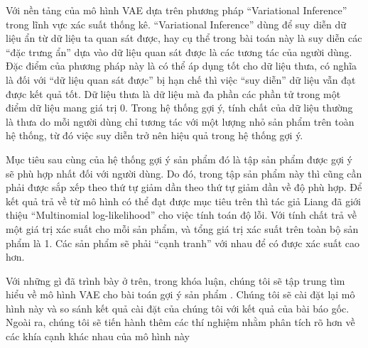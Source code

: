 Với nền tảng của mô hình VAE dựa trên phương pháp ``Variational Inference'' trong lĩnh vực xác suất thống kê. 
``Variational Inference'' dùng để suy diễn dữ liệu ẩn từ dữ liệu ta quan sát được, hay cụ thể trong bài toán này là suy diễn các ``đặc trưng ẩn'' dựa vào dữ liệu quan sát được là các tương tác của người dùng. 
Đặc điểm của phương pháp này là có thể áp dụng tốt cho dữ liệu thưa, có nghĩa là đối với ``dữ liệu quan sát được'' bị hạn chế thì việc ``suy diễn'' dữ liệu vẫn đạt được kết quả tốt. 
Dữ liệu thưa là dữ liệu mà đa phần các phần tử trong một điểm dữ liệu mang giá trị 0.
Trong hệ thống gợi ý, tính chất của dữ liệu thường là thưa do mỗi người dùng chỉ tương tác với một lượng nhỏ sản phẩm trên toàn hệ thống, từ đó việc suy diễn trở nên hiệu quả trong hệ thống gợi ý.

Mục tiêu sau cùng của hệ thống gợi ý sản phẩm đó là tập sản phẩm được gợi ý sẽ phù hợp nhất đối với người dùng. 
Do đó, trong tập sản phẩm này thì cũng cần phải được sắp xếp theo thứ tự giảm dần theo thứ tự giảm dần về độ phù hợp.
Để kết quả trả về từ mô hình có thể đạt được mục tiêu trên thì tác giả Liang đã giới thiệu ``Multinomial log-likelihood'' cho việc tính toán độ lỗi. 
Với tính chất trả về một giá trị xác suất cho mỗi sản phẩm, và tổng giá trị xác suất trên toàn bộ sản phẩm là 1. 
Các sản phẩm sẽ phải ``cạnh tranh'' với nhau để có được xác suất cao hơn.

Với những gì đã trình bày ở trên, trong khóa luận, chúng tôi sẽ tập trung tìm hiểu về mô hình VAE cho bài toán gợi ý sản phẩm \cite{mvae}. 
Chúng tôi sẽ cài đặt lại mô hình này và so sánh kết quả cài đặt của chúng tôi với kết quả của bài báo gốc.
Ngoài ra, chúng tôi sẽ tiến hành thêm các thí nghiệm nhằm phân tích rõ hơn về các khía cạnh khác nhau của mô hình này



